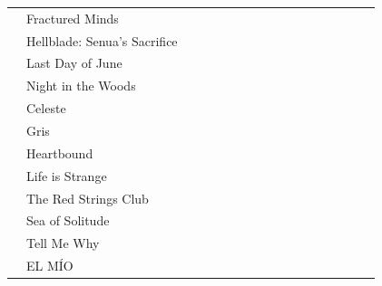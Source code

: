 \documentclass[twoside]{urjc-tfg}
\begin{document}
\begin{landscape}
\begin{longtable}{l  l  *{15}{c} }
                      & Fractured Minds              &      &      &        &       &                      &                   &                   &                   &                   \\
                      & Hellblade: Senua's Sacrifice &      &      &        &       &                      &                   &                   &                   &                   \\
                      & Last Day of June             &      &      &        &       &                      &                   &                   &                   &                   \\
                      & Night in the Woods           &      &      &        &       &                      &                   &                   &                   &                   \\
                      & Celeste                      &      &      &        &       &                      &                   &                   &                   &                   \\
                      & Gris                         &      &      &        &       &                      &                   &                   &                   &                   \\
                      & Heartbound                   &      &      &        &       &                      &                   &                   &                   &                   \\
                      & Life is Strange              &      &      &        &       &                      &                   &                   &                   &                   \\
                      & The Red Strings Club         &      &      &        &       &                      &                   &                   &                   &                   \\
                      & Sea of Solitude              &      &      &        &       &                      &                   &                   &                   &                   \\
                      & Tell Me Why                  &      &      &        &       &                      &                   &                   &                   &                   \\
                      & EL MÍO                       &      &      &        &       &                      &                   &                   &                   &                   \\
\bottomrule
                    \end{longtable}
\end{landscape}
\end{document}
